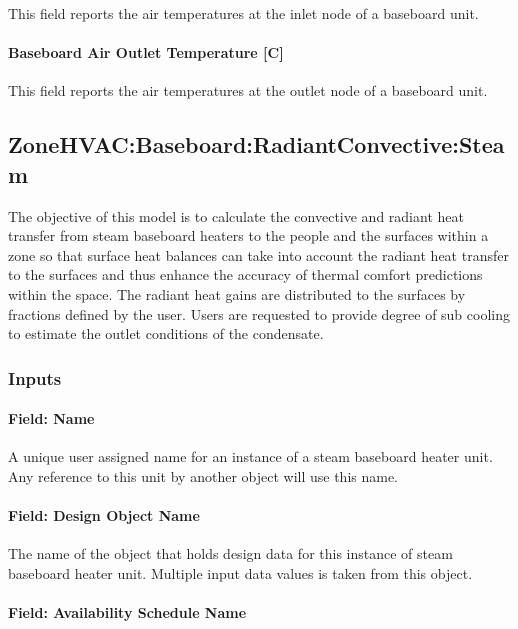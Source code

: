 This field reports the air temperatures at the inlet node of a baseboard unit.

\paragraph{Baseboard Air Outlet Temperature {[}C{]}}\label{baseboard-air-outlet-temperature-c}

This field reports the air temperatures at the outlet node of a baseboard unit.

\subsection{ZoneHVAC:Baseboard:RadiantConvective:Steam}\label{zonehvacbaseboardradiantconvectivesteam}

The objective of this model is to calculate the convective and radiant heat transfer from steam baseboard heaters to the people and the surfaces within a zone so that surface heat balances can take into account the radiant heat transfer to the surfaces and thus enhance the accuracy of thermal comfort predictions within the space. The radiant heat gains are distributed to the surfaces by fractions defined by the user. Users are requested to provide degree of sub cooling to estimate the outlet conditions of the condensate.

\subsubsection{Inputs}\label{inputs-1-035}

\paragraph{Field: Name}\label{field-name-1-034}

A unique user assigned name for an instance of a steam baseboard heater unit. Any reference to this unit by another object will use this name.

\paragraph{Field: Design Object Name}\label{SteamBB_DesignObjectName}

The name of the object that holds design data for this instance of steam baseboard heater unit. Multiple input data values is taken from this object.

\paragraph{Field: Availability Schedule Name}\label{field-availability-schedule-name-1-010}

